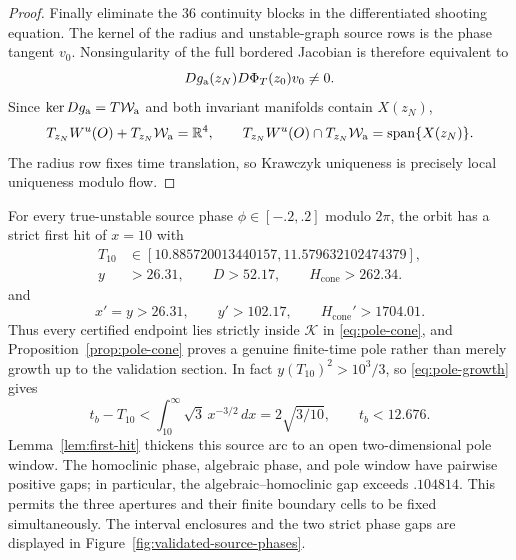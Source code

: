 \documentclass[11pt]{amsart}
\numberwithin{equation}{section}
\theoremstyle{definition}
\theoremstyle{remark}
\newcommand{\R}{\mathbb R}
\begin{document}
\begin{proof}
Finally eliminate the $36$ continuity blocks in the differentiated
shooting equation.  The kernel of the radius and unstable-graph source rows
is the phase tangent $v_0$.  Nonsingularity of the full bordered Jacobian is
therefore equivalent to
\begin{equation}\label{eq:algebraic-terminal-transversality-row}
 Dg_{\rm a}(z_N)D\Phi_T(z_0)v_0\ne0.
\end{equation}
Since $\ker Dg_{\rm a}=T\mathcal W_{\rm a}$ and both invariant manifolds
contain $X(z_N)$,
\begin{equation}\label{eq:algebraic-ambient-transversality}
 T_{z_N}W^u(O)+T_{z_N}\mathcal W_{\rm a}=\R^4,\qquad
 T_{z_N}W^u(O)\cap T_{z_N}\mathcal W_{\rm a}
 =\operatorname{span}\{X(z_N)\}.
\end{equation}
The radius row fixes time translation, so Krawczyk uniqueness is precisely
local uniqueness modulo flow.
\end{proof}

For every true-unstable source phase $\phi\in[-.2,.2]$ modulo $2\pi$, the
orbit has a strict first hit of $x=10$ with
\begin{align}
 T_{10}&\in[10.885720013440157,11.579632102474379],
 \label{eq:pole-validated-time}\\
 y&>26.31,\qquad D>52.17,
 \qquad H_{\mathrm{cone}}>262.34.
 \label{eq:pole-validated-bounds}
\end{align}
and
\begin{equation}\label{eq:pole-validated-speeds}
 x'=y>26.31,\qquad y'>102.17,\qquad
 H_{\mathrm{cone}}'>1704.01.
\end{equation}
Thus every certified endpoint lies strictly inside
$\mathcal K$ in \eqref{eq:pole-cone}, and
Proposition~\ref{prop:pole-cone} proves a genuine finite-time pole rather
than merely growth up to the validation section.  In fact
$y(T_{10})^2>10^3/3$, so \eqref{eq:pole-growth} gives
\begin{equation}\label{eq:pole-remaining-time}
 t_b-T_{10}<\int_{10}^\infty\sqrt3\,x^{-3/2}\,dx
 =2\sqrt{3/10},\qquad t_b<12.676.
\end{equation}
Lemma~\ref{lem:first-hit} thickens this source arc to an open
two-dimensional pole window.  The homoclinic phase, algebraic phase, and
pole window have pairwise positive gaps; in particular, the
algebraic--homoclinic gap exceeds $.104814$.  This permits the three
apertures and their finite boundary cells to be fixed simultaneously.
The interval enclosures and the two strict phase gaps are displayed in
Figure~\ref{fig:validated-source-phases}.
\end{document}
